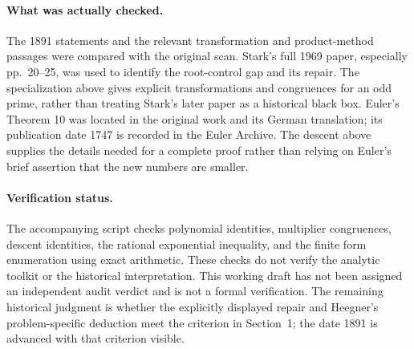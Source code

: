 \documentclass[11pt]{article}
\begin{document}
\paragraph{What was actually checked.}
The 1891 statements and the relevant transformation and product-method
passages were compared with the original scan. Stark's full 1969 paper,
especially pp.~20--25, was used to identify the root-control gap and
its repair. The specialization above gives explicit transformations
and congruences for an odd prime, rather than treating Stark's later
paper as a historical black box. Euler's Theorem 10 was located in
the original work and its German translation; its publication date
1747 is recorded in the Euler Archive. The descent above supplies
the details needed for a complete proof rather than relying on
Euler's brief assertion that the new numbers are smaller.

\paragraph{Verification status.}
The accompanying script checks polynomial identities, multiplier
congruences, descent identities, the rational exponential inequality,
and the finite form enumeration using exact arithmetic. These checks
do not verify the analytic toolkit or the historical interpretation.
This working draft has not been assigned an independent audit verdict
and is not a formal verification. The remaining historical judgment
is whether the explicitly displayed repair and Heegner's
problem-specific deduction meet the criterion in Section~1;
the date 1891 is advanced with that criterion visible.
\end{document}
